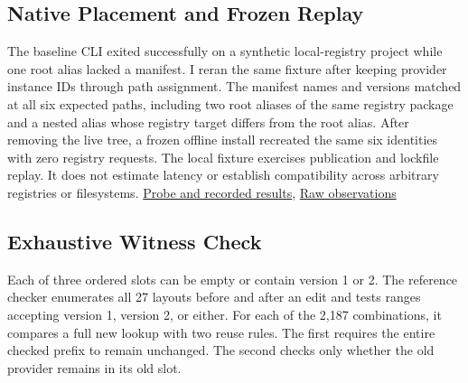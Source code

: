 \documentclass[
  11pt,
  letterpaper,
]{article}
\begin{document}
\subsection{Native Placement and Frozen
Replay}\label{native-placement-and-frozen-replay}

The baseline CLI exited successfully on a synthetic local-registry
project while one root alias lacked a manifest. I reran the same fixture
after keeping provider instance IDs through path assignment. The
manifest names and versions matched at all six expected paths, including
two root aliases of the same registry package and a nested alias whose
registry target differs from the root alias. After removing the live
tree, a frozen offline install recreated the same six identities with
zero registry requests. The local fixture exercises publication and
lockfile replay. It does not estimate latency or establish compatibility
across arbitrary registries or filesystems.
\href{../../scripts/bench/jagr_nested_install_probe.py}{Probe and
recorded results},
\href{../architecture/experiments/jagr-nested-install-probe-2026-11-13.json}{Raw
observations}

\subsection{Exhaustive Witness Check}\label{exhaustive-witness-check}

Each of three ordered slots can be empty or contain version 1 or 2. The
reference checker enumerates all 27 layouts before and after an edit and
tests ranges accepting version 1, version 2, or either. For each of the
2,187 combinations, it compares a full new lookup with two reuse rules.
The first requires the entire checked prefix to remain unchanged. The
second checks only whether the old provider remains in its old slot.
\end{document}

